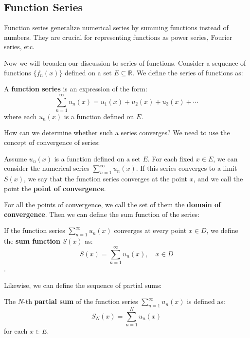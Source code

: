 \documentclass[oneside]{book}
\begin{document}
\subsection{Function Series}

Function series generalize numerical series by summing functions instead of numbers. They are crucial for representing functions as power series, Fourier series, etc.

Now we will broaden our discussion to series of functions. Consider a sequence of functions $\{f_n(x)\}$ defined on a set $E \subseteq \mathbb{R}$. We define the series of functions as:

\begin{definition}
A \textbf{function series} is an expression of the form:
\[ \sum_{n=1}^{\infty} u_n(x) = u_1(x) + u_2(x) + u_3(x) + \cdots \]
where each $u_n(x)$ is a function defined on $E$.
\end{definition}

How can we determine whether such a series converges? We need to use the concept of convergence of series:

\begin{definition}
    Assume $u_n(x)$ is a function defined on a set $E$. For each fixed $x \in E$, we can consider the numerical series $\sum_{n=1}^{\infty} u_n(x)$. If this series converges to a limit $S(x)$, we say that the function series converges at the point $x$, and we call the point the \textbf{point of convergence}.
\end{definition}

For all the points of convergence, we call the set of them the \textbf{domain of convergence}. Then we can define the sum function of the series:

\begin{definition}
If the function series $\sum_{n=1}^{\infty} u_n(x)$ converges at every point $x \in D$, we define the \textbf{sum function} $S(x)$ as:
\[ S(x) = \sum_{n=1}^{\infty} u_n(x), \quad x \in D \].
\end{definition}

Likewise, we can define the sequence of partial sums:

\newpage

\begin{definition}
The $N$-th \textbf{partial sum} of the function series $\sum_{n=1}^{\infty} u_n(x)$ is defined as:
\[ S_N(x) = \sum_{n=1}^{N} u_n(x) \]
for each $x \in E$.
\end{definition}
\end{document}
